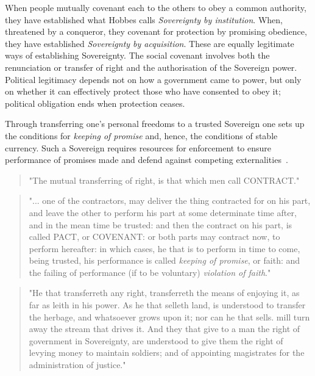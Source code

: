 \documentclass[11pt, oneside]{book}   	%
\begin{document}
When people mutually covenant each to the others to obey a common authority, they have established what Hobbes calls \emph{Sovereignty by institution}. When, threatened by a conqueror, they covenant for protection by promising obedience, they have established \emph{Sovereignty by acquisition}. These are equally legitimate ways of establishing Sovereignty. The social covenant involves both the renunciation or transfer of right and the authorisation of the Sovereign power. Political legitimacy depends not on how a government came to power, but only on whether it can effectively protect those who have consented to obey it; political obligation ends when protection ceases.\par

Through transferring one's personal freedoms to a trusted Sovereign one sets up the conditions for \emph{keeping of promise} and, hence, the conditions of stable currency. Such a Sovereign requires resources for enforcement to ensure performance of promises made and defend against competing externalities~\cite{th1}.

\begin{quote}
"The mutual transferring of right, is that which men call CONTRACT."
\end{quote}
\begin{quote}
"... one of the contractors, may deliver the thing contracted for on his part, and leave the other to perform his part at some determinate time after, and in the mean time be trusted: and then the contract on his part, is called PACT, or COVENANT: or both parts may contract now, to perform hereafter: in which cases, he that is to perform in time to come, being trusted, his performance is called \emph{keeping of promise}, or faith: and the failing of performance (if to be voluntary) \emph{violation of faith}."
\end{quote}

\pagebreak

\begin{quote}
"He that transferreth any right, transferreth the means of enjoying it, as far as leith in his power. As he that selleth land, is understood to transfer the herbage, and whatsoever grows upon it; nor can he that sells. mill turn away the stream that drives it. And they that give to a man the right of government in Sovereignty, are understood to give them the right of levying money to maintain soldiers; and of appointing magistrates for the administration of justice."
\end{quote}
\end{document}
